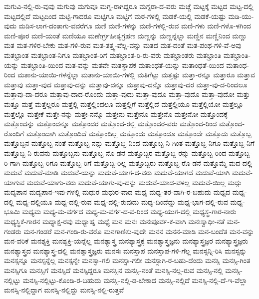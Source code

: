 {ಮಗುವಿ-ನಲ್ಲಿ-ರು-ವುವು
ಮಗುವು
ಮಗುವೂ
ಮಗ್ನ-ರಾಗಿದ್ದರೂ
ಮಗ್ನರಾ-ದ-ವರು
ಮಚ್ಚೆ
ಮಟ್ಟಕ್ಕೆ
ಮಟ್ಟದ
ಮಟ್ಟ-ದಲ್ಲಿ
ಮಟ್ಟದಲ್ಲಿದೆ
ಮಟ್ಟದಿಂದ
ಮಟ್ಟಿ-ಗಾದರೂ
ಮಟ್ಟಿಗೂ
ಮಟ್ಟಿಗೆ
ಮಠ-ಗಳಲ್ಲಿ
ಮಡಕೆ-ಯಲ್ಲಿ
ಮಡಕೆ-ಯಷ್ಟು
ಮಡಿ-ಯು-ವುದು
ಮಡಿಸ-ಲಾಗ-ದಂತಾಗು-ವವರೆಗೂ
ಮಣಿ
ಮಣಿ-ಗಳನ್ನು
ಮಣಿ-ಗಳಲ್ಲಿ-ರುವ
ಮಣಿ-ಗಳು
ಮಣಿ-ಗಳೊ-ಳಗಿಂದ
ಮಣಿ-ಪೂರ
ಮಣಿ-ಯಂತೆ
ಮಣಿಯೂ
ಮಣೇರ್ಗ್ರಹೀತೃಗ್ರಹಣ
ಮಣ್ಣನ್ನು
ಮಣ್ಣನ್ನೆಲ್ಲಾ
ಮಣ್ಣಿನ
ಮಣ್ಣಿನಿಂದ
ಮಣ್ಣು
ಮತ
ಮತ-ಗಳಿರ-ಬೇಕು
ಮತ-ಗಳಿ-ರುವ
ಮತ-ತತ್ತ್ವ-ವೆಲ್ಲ-ವನ್ನು
ಮತದ
ಮತ-ದಂತೆ
ಮತ-ಪಂಥ-ಗಳಿ-ವೆ-ಅವು
ಮತಭ್ರಾಂತ
ಮತಭ್ರಾಂತ-ನಿಗೂ
ಮತಭ್ರಾಂತ-ರಿಗೆ
ಮತಭ್ರಾಂತ-ರಿ-ರು-ವರು
ಮತಭ್ರಾಂತರು
ಮತಭ್ರಾಂತಿ
ಮತಭ್ರಾಂತಿ-ಯನ್ನು
ಮತಭ್ರಾಂತಿ-ಯಿಂದ
ಮತ-ವನ್ನು
ಮತವೇ
ಮತಸ್ಥಾಪಕ
ಮತಾಂಧತೆ-ಯನ್ನು
ಮತಾಂಧತೆ-ಯಿಂದ
ಮತಾಂಧ-ರಿಂದ
ಮತಾನು-ಯಾಯಿ-ಗಳನ್ನೆಲ್ಲಾ
ಮತಾನು-ಯಾಯಿ-ಗಳಲ್ಲಿ
ಮತಿಗೆಟ್ಟು
ಮತ್ತಷ್ಟು
ಮತ್ತಾ-ರನ್ನೂ
ಮತ್ತಾರೂ
ಮತ್ತಾವ
ಮತ್ತಾವು
ಮತ್ತಾ-ವುದ
ಮತ್ತಾವು-ದನ್ನು
ಮತ್ತಾವು-ದನ್ನೂ
ಮತ್ತಾವು-ದನ್ನೊ
ಮತ್ತಾವು-ದರ
ಮತ್ತಾ-ವು-ದ-ರಿಂದಲೂ
ಮತ್ತಾವು-ದಾ-ದರೂ
ಮತ್ತಾವು-ದಾದ-ರೊಂದು
ಮತ್ತಾ-ವುದು
ಮತ್ತಾ-ವುದೂ
ಮತ್ತಾ-ವುದೊ
ಮತ್ತಾ-ವುದೋ
ಮತ್ತು
ಮತ್ತೂ
ಮತ್ತೆ
ಮತ್ತೆಲ್ಲರೂ
ಮತ್ತೆಲ್ಲಿ
ಮತ್ತೆಲ್ಲಿಂದಲೂ
ಮತ್ತೆಲ್ಲಿಗೆ
ಮತ್ತೆಲ್ಲಿದೆ
ಮತ್ತೆಲ್ಲಿಯೂ
ಮತ್ತೆಲ್ಲಿಯೋ
ಮತ್ತೆಲ್ಲೂ
ಮತ್ತೆಲ್ಲೊ
ಮತ್ತೇಕೆ
ಮತ್ತೇ-ನನ್ನು
ಮತ್ತೇ-ನನ್ನೊ
ಮತ್ತೇನು
ಮತ್ತೇನೂ
ಮತ್ತೇನೊ
ಮತ್ತೇನೋ
ಮತ್ತೊಂದಕ್ಕೆ
ಮತ್ತೊಂದನ್ನು
ಮತ್ತೊಂದನ್ನೂ
ಮತ್ತೊಂದರ
ಮತ್ತೊಂದ-ರಲ್ಲಿ
ಮತ್ತೊಂದರ-ವರು
ಮತ್ತೊಂದ-ರಿಂದ
ಮತ್ತೊಂದ-ರೊಂದಿಗೆ
ಮತ್ತೊಂದಾಗಿ
ಮತ್ತೊಂದಿದೆ
ಮತ್ತೊಂದಿಲ್ಲ
ಮತ್ತೊಂದು
ಮತ್ತೊಂದೂ
ಮತ್ತೊಂದೇ
ಮತ್ತೊದು
ಮತ್ತೊಬ್ಬ
ಮತ್ತೊಬ್ಬನ
ಮತ್ತೊಬ್ಬ-ನಂತೆ
ಮತ್ತೊಬ್ಬ-ನನ್ನು
ಮತ್ತೊಬ್ಬ-ನಿಂದ
ಮತ್ತೊಬ್ಬ-ನಿ-ಗಿಂತ
ಮತ್ತೊಬ್ಬ-ನಿಗೂ
ಮತ್ತೊಬ್ಬ-ನಿಗೆ
ಮತ್ತೊಬ್ಬ-ನಿ-ರುವನು
ಮತ್ತೊಬ್ಬನು
ಮತ್ತೊಬ್ಬ-ನೊ-ಡನೆ
ಮತ್ತೊಬ್ಬರ
ಮತ್ತೊಬ್ಬ-ರನ್ನು
ಮತ್ತೊಬ್ಬ-ರಿಂದ
ಮತ್ತೊಬ್ಬ-ರಿ-ಗಾಗಿ
ಮತ್ತೊಬ್ಬ-ರಿಗೂ
ಮತ್ತೊಬ್ಬ-ರಿಗೆ
ಮತ್ತೊಬ್ಬ-ರಿಲ್ಲ
ಮತ್ತೊಬ್ಬರು
ಮತ್ತೊಬ್ಬ-ರೊ-ಡನೆ
ಮತ್ತೊಮ್ಮೆ
ಮದ-ದಲ್ಲಿ
ಮದುವೆ
ಮದುವೆ-ಮಾಡಿ
ಮದುವೆ-ಯನ್ನು
ಮದುವೆ-ಯಾಗ-ದ-ವರು
ಮದುವೆ-ಯಾಗದೆ
ಮದುವೆ-ಯಾಗಿ
ಮದುವೆ-ಯಾಗುವ
ಮದುವೆ-ಯಾಗು-ವರು
ಮದುವೆ-ಯಾಗು-ವು-ದನ್ನು
ಮದುವೆ-ಯಾದ-ವಳಲ್ಲ
ಮದುವೆ-ಯಿಲ್ಲ
ಮದ್ಗು
ಮದ್ಯಪಾನ
ಮದ್ಯಪಾನ-ಇವು-ಗಳಲ್ಲಿ
ಮಧುರ
ಮಧುರ-ವಾದ
ಮಧ್ಯ
ಮಧ್ಯ-ತರ-ವಾಗಿ-ರ-ಬಹುದು
ಮಧ್ಯದ
ಮಧ್ಯ-ದಲ್ಲಿ
ಮಧ್ಯ-ದಲ್ಲಿಯೂ
ಮಧ್ಯ-ದಲ್ಲಿ-ರುವ
ಮಧ್ಯ-ದಲ್ಲಿ-ರುವುದು
ಮಧ್ಯ-ದಿಂದೆದ್ದು
ಮಧ್ಯ-ಭಾಗ-ದಲ್ಲಿ-ರುವ
ಮಧ್ಯ-ಭೂಮಿ
ಮಧ್ಯಮ
ಮಧ್ಯ-ಮ-ವರ್ಗದ
ಮಧ್ಯ-ಮ-ವರ್ಗ-ದ-ವ-ರಿಂದ
ಮಧ್ಯ-ಯುಗ-ದಲ್ಲಿ
ಮಧ್ಯಸ್ಥ-ಗಾರ-ನಾರು
ಮಧ್ಯಸ್ಥಿಕೆ-ಗಾರನ
ಮಧ್ಯಾಕ್ಷ-ರವು
ಮಧ್ಯಾಹ್ನ
ಮಧ್ಯೆ
ಮನ
ಮನಃ
ಮನಃಪೂರ್ವ-ಕ-ವಾಗಿ
ಮನಃಸ್ವಾಧೀ-ನತೆ
ಮನ-ಗಂಡರು
ಮನ-ಗಂಡರೆ
ಮನ-ಗಂಡಿ-ರು-ವರೊ
ಮನಗಾಣಿಸು-ವುದೇ
ಮನನ
ಮನನ-ಮಾಡಿ
ಮನ-ಬಂದೆತ
ಮನ-ವನ್ನು
ಮನ-ವರಿಕೆ
ಮನಶ್ಯಕ್ತಿ
ಮನಶ್ಯಕ್ತಿ-ಯನ್ನೆಲ್ಲ
ಮನಶ್ಯಾಸ್ತ್ರ
ಮನಶ್ಯಾಸ್ತ್ರಕ್ಕೆ
ಮನಶ್ಯಾಸ್ತ್ರಜ್ಞನು
ಮನಶ್ಯಾಸ್ತ್ರಜ್ಞರ
ಮನಶ್ಯಾಸ್ತ್ರಜ್ಞರು
ಮನಶ್ಯಾಸ್ತ್ರದ
ಮನಶ್ಯಾಸ್ತ್ರ-ದಲ್ಲಿ
ಮನಶ್ಶಾಸ್ತ್ರಜ್ಞರು
ಮನಸಃ
ಮನಸ್ತಾಪ
ಮನಸ್ತಾಪ-ಗಳಿ-ಗೆಲ್ಲ
ಮನಸ್ಸನ್ನಿ-ರಿಸಿ
ಮನಸ್ಸನ್ನು
ಮನಸ್ಸನ್ನೂ
ಮನಸ್ಸನ್ನೆಲ್ಲ
ಮನಸ್ಸನ್ನೇ
ಮನಸ್ಸಾ-ಗಲಿ
ಮನಸ್ಸಾ-ಗಲೀ
ಮನಸ್ಸಾಗಿ-ರ-ಬಹು-ದೆಂದು
ಮನಸ್ಸಿ
ಮನಸ್ಸಿ-ಗಿಂತ
ಮನಸ್ಸಿಗೂ
ಮನಸ್ಸಿಗೆ
ಮನಸ್ಸಿದೆ
ಮನಸ್ಸಿದ್ದರೂ
ಮನಸ್ಸಿನ
ಮನಸ್ಸಿ-ನಂತೆ
ಮನಸ್ಸಿ-ನಲ್ಲ-ರುವ
ಮನಸ್ಸಿ-ನಲ್ಲಿ
ಮನಸ್ಸಿ-ನಲ್ಲಿಟ್ಟು
ಮನಸ್ಸಿ-ನಲ್ಲಿಟ್ಟು-ಕೊಂಡಿ-ರ-ಬಹುದು
ಮನಸ್ಸಿ-ನಲ್ಲಿ-ಡ-ಬೇಕಾದ
ಮನಸ್ಸಿ-ನಲ್ಲಿದೆ
ಮನಸ್ಸಿ-ನಲ್ಲಿ-ದೆ-ಇ-ವೆಲ್ಲಾ
ಮನಸ್ಸಿ-ನಲ್ಲಿದ್ದಾಗ
ಮನಸ್ಸಿ-ನಲ್ಲಿದ್ದು
ಮನಸ್ಸಿ-ನಲ್ಲಿ-ರುತ್ತವೆ
}
